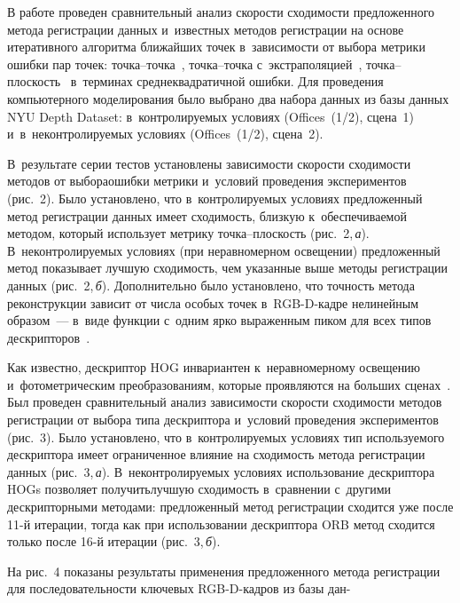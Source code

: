 \begin{multicols}{2}
  В работе проведен сравнительный анализ скорости сходимости 
предложенного метода регистрации данных и~известных методов регистрации 
на основе итеративного алгоритма ближайших точек\linebreak
 в~зависимости от выбора 
метрики ошибки пар точек: точ\-ка--точ\-ка~\cite{6-voh}, точ\-ка--точ\-ка 
с~экстраполяцией~\cite{8-voh}, точ\-ка--плос\-кость~\cite{14-voh} в~терминах 
среднеквадратичной ошибки. Для проведения \mbox{компьютерного} моделирования 
было выбрано два набора данных из базы данных NYU Depth Dataset: 
в~контролируемых условиях (Offices~(1/2), сцена~1) и~в~неконтролируемых 
условиях (Offices~(1/2), сцена~2). 

В~результате серии тестов установлены 
зависимости скорости сходимости методов от выбора\linebreak ошибки метрики 
и~условий проведения экс\-пе\-ри\-мен\-тов (рис.~2). Было установлено, что 
в~конт\-ро\-ли\-ру\-емых условиях предложенный метод регистрации данных имеет 
сходимость, близкую \mbox{к~обеспечиваемой} методом, который использует метрику 
точ\-ка--плос\-кость (рис.~2,\,\textit{а}). В~неконтролируемых условиях (при 
неравномерном освещении) предложенный метод показывает лучшую 
сходимость, чем указанные выше методы регистрации данных 
(рис.~2,\,\textit{б}). Дополнительно было установлено, что точность метода 
реконструкции зависит от числа особых точек в~RGB-D-кад\-ре нелинейным 
образом~--- в~виде функции с~одним ярко выраженным пиком для всех типов 
дескрипторов~\cite{21-voh, 22-voh}.
  
  
  
  Как известно, дескриптор HOG инвариантен к~неравномерному освещению 
и~фотометрическим преобразованиям, которые проявляются на больших 
сценах~\cite{15-voh}. Был проведен сравнительный анализ за\-ви\-си\-мости 
ско\-рости схо\-ди\-мости методов регистрации от выбора типа дескриптора 
и~условий проведения экспериментов (рис.~3). Было установлено, что 
в~конт\-ро\-ли\-ру\-емых условиях тип используемого дескриптора имеет 
ограниченное влияние на схо\-ди\-мость метода регистрации данных\linebreak 
(рис.~3,\,\textit{а}). В~неконтролируемых условиях ис\-поль\-зование дескриптора 
HOGs позволяет получить\linebreak лучшую схо\-ди\-мость в~сравнении с~другими 
дескрипторными методами: предложенный метод регистрации сходится уже 
после 11-й итерации, тогда как при использовании дескриптора ORB метод 
сходится только после 16-й итерации (рис.~3,\,\textit{б}).

 На рис.~4 показаны 
результаты применения предложенного метода регистрации для 
по\-сле\-до\-ва\-тель\-ности ключевых RGB-D-кадров из базы 
дан-\linebreak\vspace*{-10pt}

\pagebreak

\end{multicols}

